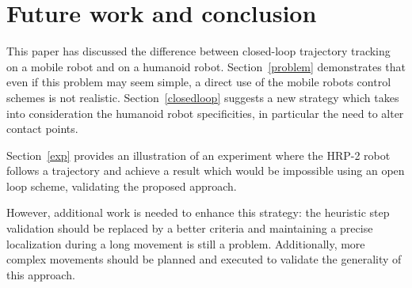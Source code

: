 \section{Future work and conclusion}


This paper has discussed the difference between closed-loop trajectory
tracking on a mobile robot and on a humanoid
robot. Section~\ref{problem} demonstrates that even if this problem
may seem simple, a direct use of the mobile robots control schemes is
not realistic.  Section~\ref{closedloop} suggests a new strategy which
takes into consideration the humanoid robot specificities, in
particular the need to alter contact points.


Section~\ref{exp} provides an illustration of an experiment where the
HRP-2 robot follows a trajectory and achieve a result which would be
impossible using an open loop scheme, validating the proposed
approach.


However, additional work is needed to enhance this strategy: the
heuristic step validation should be replaced by a better criteria and
maintaining a precise localization during a long movement is still a
problem. Additionally, more complex movements should be planned and
executed to validate the generality of this approach.

